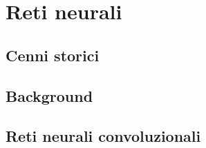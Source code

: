 
\chapter{Reti neurali}\label{chp:CNN}

\section{Cenni storici}

\section{Background}

\section{Reti neurali convoluzionali}

